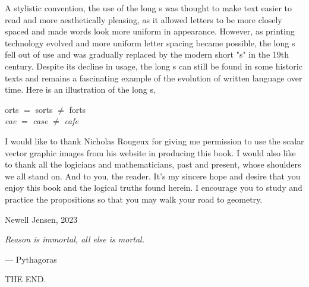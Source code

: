 \documentclass[twoside,11pt]{report}
\begin{document}
A stylistic convention, the use of the long s was thought to make text easier to read and more aesthetically pleasing, as it allowed letters to be more closely spaced and made words look more uniform in appearance. However, as printing technology evolved and more uniform letter spacing became possible, the long s fell out of use and was gradually replaced by the modern short "s" in the 19th century. Despite its decline in usage, the long s can still be found in some historic texts and remains a fascinating example of the evolution of written language over time.  Here is an illustration of the long s,
\begin{center}
  {\color{cred}{ſ}}orts $=$ sorts $\neq$ forts\\
  \textit{ca{\color{cred}{ſ}}e} $=$ \textit{case} $\neq$ \textit{cafe}
\end{center}

I would like to thank Nicholas Rougeux for giving me permission to use the scalar vector graphic images from his website in producing this book.  I would also like to thank all the logicians and mathematicians, past and present, whose shoulders we all stand on.  And to you, the reader.  It's my sincere hope and desire that you enjoy this book and the logical truths found herein.  I encourage you to study and practice the propositions so that you may walk your {\color{cred}{o}}{\color{cblue}{w}}{\color{cyellow}{n}} road to geometry.

\hfill

\begin{flushright}
  Newell Jensen, 2023
\end{flushright}

\newpage

\vspace*{\fill}

\begin{center}
  \textit{Reason is immortal, all else is mortal.}

  \hspace{8em}--- Pythagoras
\end{center}

\vspace*{\fill}

\newpage

\tableofcontents

\newpage










\newpage

\thispagestyle{empty}
\vspace*{\fill}
\begin{center}
  \scshape{\LARGE{THE END.}}
\end{center}
\vspace*{\fill}
\end{document}
